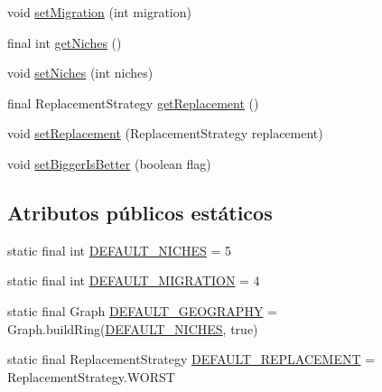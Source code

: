 \begin{DoxyCompactItemize}
void \hyperlink{classjenes_1_1algorithms_1_1_island_g_a_3_01_t_01extends_01_chromosome_01_4_a309c1fe9c74c728b2ecab37e91f09322}{set\-Migration} (int migration)
\item 
final int \hyperlink{classjenes_1_1algorithms_1_1_island_g_a_3_01_t_01extends_01_chromosome_01_4_a5642fdd072cd93a61d7ef3f1b5a806ad}{get\-Niches} ()
\item 
void \hyperlink{classjenes_1_1algorithms_1_1_island_g_a_3_01_t_01extends_01_chromosome_01_4_a5ad013b697d423948678c584adde46f7}{set\-Niches} (int niches)
\item 
final Replacement\-Strategy \hyperlink{classjenes_1_1algorithms_1_1_island_g_a_3_01_t_01extends_01_chromosome_01_4_aba40738c3ed2724093a13ec8019d2e11}{get\-Replacement} ()
\item 
void \hyperlink{classjenes_1_1algorithms_1_1_island_g_a_3_01_t_01extends_01_chromosome_01_4_a980d98b95084ac99094dac0d7d231366}{set\-Replacement} (Replacement\-Strategy replacement)
\item 
void \hyperlink{classjenes_1_1algorithms_1_1_island_g_a_3_01_t_01extends_01_chromosome_01_4_aedb02e8ab567910d449869a8bd778225}{set\-Bigger\-Is\-Better} (boolean flag)
\end{DoxyCompactItemize}
\subsection*{Atributos públicos estáticos}
\begin{DoxyCompactItemize}
\item 
static final int \hyperlink{classjenes_1_1algorithms_1_1_island_g_a_3_01_t_01extends_01_chromosome_01_4_a37c9c99c1181aa1f194ad610bdb4d25f}{D\-E\-F\-A\-U\-L\-T\-\_\-\-N\-I\-C\-H\-E\-S} = 5
\item 
static final int \hyperlink{classjenes_1_1algorithms_1_1_island_g_a_3_01_t_01extends_01_chromosome_01_4_a114bd755cf3def2fffb318ab4f40569a}{D\-E\-F\-A\-U\-L\-T\-\_\-\-M\-I\-G\-R\-A\-T\-I\-O\-N} = 4
\item 
static final Graph \hyperlink{classjenes_1_1algorithms_1_1_island_g_a_3_01_t_01extends_01_chromosome_01_4_ae27b28d3f2b4f90898a4cc90a9bd1bd9}{D\-E\-F\-A\-U\-L\-T\-\_\-\-G\-E\-O\-G\-R\-A\-P\-H\-Y} = Graph.\-build\-Ring(\hyperlink{classjenes_1_1algorithms_1_1_island_g_a_3_01_t_01extends_01_chromosome_01_4_a37c9c99c1181aa1f194ad610bdb4d25f}{D\-E\-F\-A\-U\-L\-T\-\_\-\-N\-I\-C\-H\-E\-S}, true)
\item 
static final Replacement\-Strategy \hyperlink{classjenes_1_1algorithms_1_1_island_g_a_3_01_t_01extends_01_chromosome_01_4_a1fc6944fd99215488896c76893d5f3d0}{D\-E\-F\-A\-U\-L\-T\-\_\-\-R\-E\-P\-L\-A\-C\-E\-M\-E\-N\-T} = Replacement\-Strategy.\-W\-O\-R\-S\-T
\end{DoxyCompactItemize}
